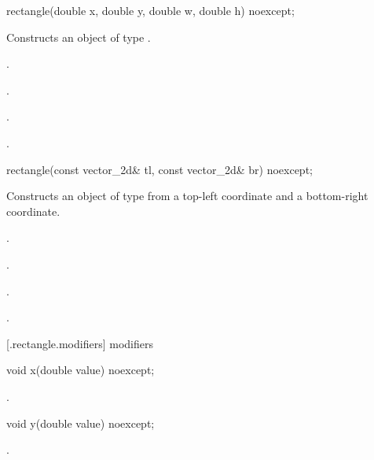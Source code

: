 \begin{itemdecl}
rectangle(double x, double y, double w, double h) noexcept;
\end{itemdecl}
\begin{itemdescr}
	\pnum
	\effects
	Constructs an object of type .
	
	\pnum
	\postconditions
	.
	
	\pnum
	.
	
	\pnum
	.
	
	\pnum
	.
	
\end{itemdescr}

\begin{itemdecl}
rectangle(const vector_2d& tl, const vector_2d& br) noexcept;
\end{itemdecl}
\begin{itemdescr}
	\pnum
	\effects
	Constructs an object of type  from a top-left coordinate and a bottom-right coordinate.
	
	\pnum
	\postconditions
	.
	
	\pnum
	.
	
	\pnum
	.
	
	\pnum
	.
	
\end{itemdescr}

 [\iotwod.rectangle.modifiers]{ modifiers}

\begin{itemdecl}
void x(double value) noexcept;
\end{itemdecl}

\begin{itemdescr}
	\pnum
	\postconditions
	.

\end{itemdescr}

\begin{itemdecl}
void y(double value) noexcept;
\end{itemdecl}
\begin{itemdescr}
	\pnum
	\postconditions
	.

\end{itemdescr}

